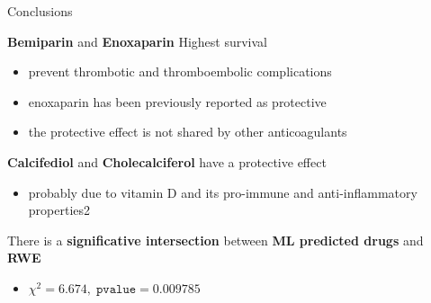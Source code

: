 \documentclass[compress,ignorenonframetext,aspectratio=1610]{beamer}
\begin{document}
\begin{frame}{Conclusions}

	\textbf{Bemiparin} and \textbf{Enoxaparin} \textrightarrow Highest survival
	\begin{itemize}
		\item prevent thrombotic and thromboembolic complications
		\item enoxaparin has been previously reported as protective
		\item the protective effect is not shared by other anticoagulants
	\end{itemize}

	\textbf{Calcifediol} and \textbf{Cholecalciferol} have a protective effect
	\begin{itemize}
		\item probably due to vitamin D and its pro-immune and anti-inflammatory properties2
	\end{itemize}

	There is a \textbf{significative intersection} between \textbf{ML predicted drugs} and \textbf{RWE}
	\begin{itemize}
		\item $\chi^{2} = 6.674, \; \mathtt{pvalue} = 0.009785$
	\end{itemize}

\end{frame}
\end{document}
